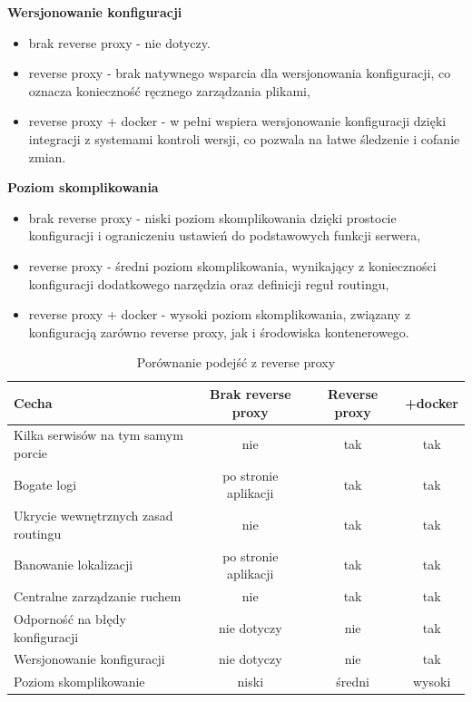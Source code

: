 \documentclass{article}
\begin{document}
\textbf{Wersjonowanie konfiguracji}
\begin{itemize}
    \item brak reverse proxy - nie dotyczy.
    \item reverse proxy - brak natywnego wsparcia dla wersjonowania konfiguracji, co oznacza konieczność ręcznego zarządzania plikami,
    \item reverse proxy + docker - w pełni wspiera wersjonowanie konfiguracji dzięki integracji z systemami kontroli wersji, co pozwala na łatwe śledzenie i cofanie zmian.
\end{itemize}

\textbf{Poziom skomplikowania}
\begin{itemize}
    \item brak reverse proxy - niski poziom skomplikowania dzięki prostocie konfiguracji i ograniczeniu ustawień do podstawowych funkcji serwera,
    \item reverse proxy - średni poziom skomplikowania, wynikający z konieczności konfiguracji dodatkowego narzędzia oraz definicji reguł routingu,
    \item reverse proxy + docker - wysoki poziom skomplikowania, związany z konfiguracją zarówno reverse proxy, jak i środowiska kontenerowego.
\end{itemize}


\begin{table}[H]
\centering
\begin{tabular}{|l|c|c|c|}
\hline
\textbf{Cecha} & \textbf{Brak reverse proxy} & \textbf{Reverse proxy} & \textbf{+docker} \\ \hline
Kilka serwisów na tym samym porcie & \cellcolor{red!50}nie & \cellcolor{green!50}tak & \cellcolor{green!50}tak \\ \hline
Bogate logi  & \cellcolor{yellow!50}po stronie aplikacji & \cellcolor{green!50}tak & \cellcolor{green!50}tak \\ \hline
Ukrycie wewnętrznych zasad routingu & \cellcolor{red!50}nie & \cellcolor{green!50}tak & \cellcolor{green!50}tak \\ \hline
Banowanie lokalizacji & \cellcolor{yellow!50}po stronie aplikacji & \cellcolor{green!50}tak & \cellcolor{green!50}tak \\ \hline
Centralne zarządzanie ruchem & \cellcolor{red!50}nie & \cellcolor{green!50}tak & \cellcolor{green!50}tak \\ \hline
Odporność na błędy konfiguracji & \cellcolor{yellow!50}nie dotyczy & \cellcolor{red!50}nie & \cellcolor{green!50}tak \\ \hline
Wersjonowanie konfiguracji & \cellcolor{yellow!50}nie dotyczy & \cellcolor{red!50}nie & \cellcolor{green!50}tak \\ \hline
Poziom skomplikowanie & \cellcolor{green!50}niski & \cellcolor{yellow!50}średni & \cellcolor{red!50}wysoki \\ \hline
\end{tabular}
\caption{Porównanie podejść z reverse proxy}
\label{tab:porownanie-metod-wdrazania}
\end{table}
\end{document}
